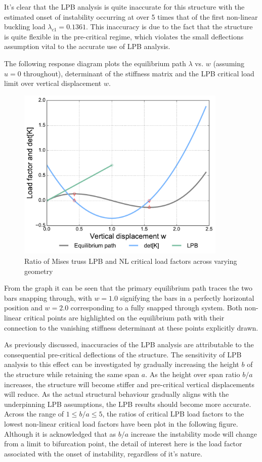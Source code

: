 It's clear that the LPB analysis is quite inaccurate for this structure with the estimated onset of instability occurring at over 5 times that of the first non-linear buckling load $\lambda_{c1} = 0.1361$. This inaccuracy is due to the fact that the structure is quite flexible in the pre-critical regime, which violates the small deflections assumption vital to the accurate use of LPB analysis.

The following response diagram plots the equilibrium path $\lambda$ vs. $w$ (assuming $u = 0$ throughout), determinant of the stiffness matrix and the LPB critical load limit over vertical displacement $w$.

\begin{figure}[H]
	\centering
	\def\svgwidth{\columnwidth}
	\includegraphics[width=10cm]{images/stability_analysis_mises_truss_1x1.pdf}
	\caption{Ratio of Mises truss LPB and NL critical load factors across varying geometry}
	\label{stab2}
\end{figure}

From the graph it can be seen that the primary equilibrium path traces the two bars snapping through, with $w=1.0$ signifying the bars in a perfectly horizontal position and $w=2.0$ corresponding to a fully snapped through system. Both non-linear critical points are highlighted on the equilibrium path with their connection to the vanishing stiffness determinant at these points explicitly drawn.

As previously discussed, inaccuracies of the LPB analysis are attributable to the consequential pre-critical deflections of the structure. The sensitivity of LPB analysis to this effect can be investigated by gradually increasing the height $b$ of the structure while retaining the same span $a$. As the height over span ratio $b/a$ increases, the structure will become stiffer and pre-critical vertical displacements will reduce. As the actual structural behaviour gradually aligns with the underpinning LPB assumptions, the LPB results should become more accurate. Across the range of $1 \le b/a \le 5$, the ratios of critical LPB load factors to the lowest non-linear critical load factors have been plot in the following figure. Although it is acknowledged that as $b/a$ increase the instability mode will change from a limit to bifurcation point, the detail of interest here is the load factor associated with the onset of instability, regardless of it's nature.

